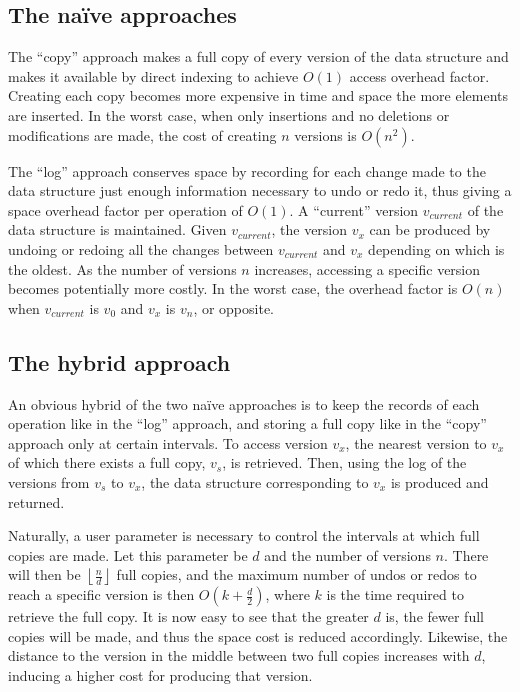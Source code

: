 \subsection{The na\"ive approaches}
The ``copy'' approach makes a full copy of every version of the data structure
and makes it available by direct indexing to achieve $O(1)$ access overhead
factor. Creating each copy becomes more expensive in time and space the more
elements are inserted. In the worst case, when only insertions and no deletions
or modifications are made, the cost of creating $n$ versions is
$O\left(n^2\right)$.

The ``log'' approach conserves space by recording for each change made to the
data structure just enough information necessary to undo or redo it, thus giving
a space overhead factor per operation of $O(1)$. A ``current'' version
$v_{current}$ of the data structure is maintained. Given $v_{current}$, the
version $v_x$ can be produced by undoing or redoing all the changes between
$v_{current}$ and $v_x$ depending on which is the oldest. As the number of
versions $n$ increases, accessing a specific version becomes potentially more
costly. In the worst case, the overhead factor is $O(n)$ when $v_{current}$ is
$v_0$ and $v_x$ is $v_n$, or opposite.

\subsection{The hybrid approach}
An obvious hybrid of the two na\"ive approaches is to keep the records of each
operation like in the ``log'' approach, and storing a full copy like in the
``copy'' approach only at certain intervals. To access version $v_x$, the
nearest version to $v_x$ of which there exists a full copy, $v_s$, is retrieved.
Then, using the log of the versions from $v_s$ to $v_x$, the data structure
corresponding to $v_x$ is produced and returned.

Naturally, a user parameter is necessary to control the intervals at which full
copies are made. Let this parameter be $d$ and the number of versions $n$. There
will then be $\left\lfloor \frac{n}{d} \right\rfloor$ full copies, and the
maximum number of undos or redos to reach a specific version is then
$O(k+\frac{d}{2})$, where $k$ is the time required to retrieve the full copy. It
is now easy to see that the greater $d$ is, the fewer full copies will be made,
and thus the space cost is reduced accordingly. Likewise, the distance to the
version in the middle between two full copies increases with $d$, inducing a
higher cost for producing that version.

